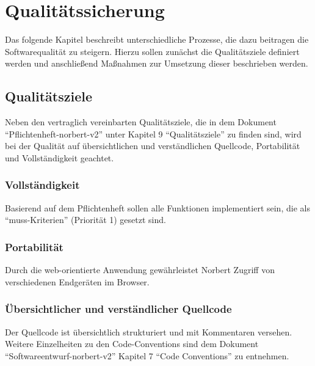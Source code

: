 
\chapter{Qualitätssicherung}
Das folgende Kapitel beschreibt unterschiedliche Prozesse, die dazu beitragen die Softwarequalität zu steigern. 
Hierzu sollen zunächst die Qualitätsziele definiert werden und anschließend Maßnahmen zur Umsetzung dieser beschrieben werden.

\section{Qualitätsziele}
Neben den vertraglich vereinbarten Qualitätsziele, die in dem Dokument \enquote{Pflichtenheft-norbert-v2} unter Kapitel 9 \enquote{Qualitätsziele} zu finden sind, wird bei der Qualität auf übersichtlichen und verständlichen Quellcode, Portabilität und Vollständigkeit geachtet.

\subsection{Vollständigkeit}
Basierend auf dem Pflichtenheft sollen alle Funktionen implementiert sein, die als \enquote{muss-Kriterien} (Priorität 1) gesetzt sind.

\subsection{Portabilität}
Durch die web-orientierte Anwendung gewährleistet Norbert Zugriff von verschiedenen Endgeräten im Browser. 

\subsection{Übersichtlicher und verständlicher Quellcode}
Der Quellcode ist übersichtlich strukturiert und mit Kommentaren versehen. Weitere Einzelheiten zu den Code-Conventions sind dem Dokument \enquote{Softwareentwurf-norbert-v2} Kapitel 7 \enquote{Code Conventions} zu entnehmen.

\newpage
